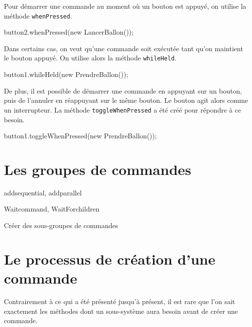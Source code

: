 \documentclass[12pt]{report}
\begin{document}
Pour démarrer une commande au moment où un bouton est appuyé, on utilise la méthode \texttt{whenPressed}.

\begin{code}
button2.whenPressed(new LancerBallon());
\end{code}

Dans certains cas, on veut qu'une commande soit exécutée tant qu'on maintient le bouton appuyé. On utilise alors la méthode \texttt{whileHeld}.

\begin{code}
button1.whileHeld(new PrendreBallon());
\end{code}

De plus, il est possible de démarrer une commande en appuyant sur un bouton, puis de l'annuler en réappuyant sur le même bouton. Le bouton agit alors comme un interrupteur. La méthode \texttt{toggleWhenPressed} a été créé pour répondre à ce besoin.

\begin{code}
button1.toggleWhenPressed(new PrendreBallon());
\end{code}

\section{Les groupes de commandes}

addsequential, addparallel

Waitcommand, WaitForchildren

Créer des sous-groupes de commandes

\section{Le processus de création d'une commande}

Contrairement à ce qui a été présenté jusqu'à présent, il est rare que l'on sait exactement les méthodes dont un sous-système aura besoin avant de créer une commande. 
\end{document}
